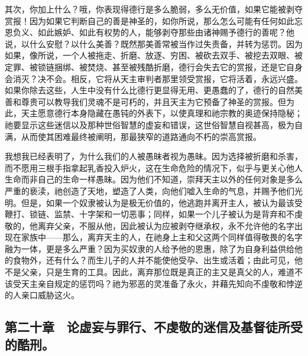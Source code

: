 其次，你加上什么？哦，你表现得德行是多么脆弱，多么无价值，如果它能被剥夺赏报！因为如果它判断自己的善是神圣的，如你所说，那么怎么可能有任何如此忘恩负义、如此嫉妒、如此有权势的人，能够剥夺那些由诸神赐予德行的善呢？他说，以什么安慰？以什么美善？既然那美善常被当作过失责备，并转为惩罚。因为如果，像所说，一个人被拖走、折磨、放逐、穷困、被砍去双手、被挖去双眼、被定罪、被锁链捆绑、被焚烧、甚至被残酷折磨，德行会失去它的赏报，还是它自身会消灭？决不会。相反，它将从天主审判者那里领受赏报，它将活着，永远兴盛。如果你除去这些，人生中没有什么比德行更显得无用、更愚蠢的了，德行的自然美善和尊贵可以教导我们灵魂不是可朽的，并且天主为它预备了神圣的赏报。但为此，天主愿意德行本身隐藏在愚钝的外表下，以使真理和祂宗教的奥迹保持隐秘；祂要显示这些迷信以及那种世俗智慧的虚妄和错误，这世俗智慧自视甚高，极为自满，从而使其困难最终被阐明，那最狭窄的道路通向不朽的崇高赏报。\par

我想我已经表明了，为什么我们的人被愚昧者视为愚昧。因为选择被折磨和杀害，而不愿用三根手指拿起乳香投入炉火，这在生命危险的情况下，似乎与更关心他人生命而非自己的生命一样愚昧。因为他们不知道，崇拜天主以外的任何对象是多么严重的亵渎，祂创造了天地，塑造了人类，向他们嘘入生命的气息，并赐予他们光明。但是，如果一个奴隶被认为是极无价值的，他逃跑并离开主人，被认为最该受鞭打、锁链、监禁、十字架和一切恶事；同样，如果一个儿子被认为是背弃和不虔敬的，他离弃父亲，不服从他，因此被认为应被剥夺继承权，永不允许他的名字出现在家族中——那么，离弃天主的人，在祂身上主和父这两个同样值得敬畏的名字融为一体，更是多么严重？因为买奴隶的人给予他的恩惠，除了为自身利益供给他的食物外，还有什么？而生儿子的人并不能使他受孕、出生或活着；由此可见，他不是父亲，只是生育的工具。因此，离弃那位既是真正的主又是真父的人，难道不该受天主亲自规定的惩罚吗？祂为邪恶的灵准备了永火，并藉先知向不虔敬和悖逆的人亲口威胁这火。\par


\subsection{第二十章　论虚妄与罪行、不虔敬的迷信及基督徒所受的酷刑。}

